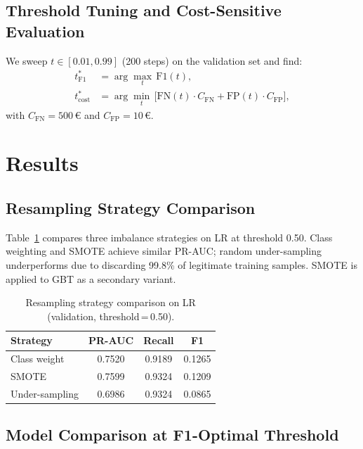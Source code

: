 \documentclass[conference]{IEEEtran}
\begin{document}
\subsection{Threshold Tuning and Cost-Sensitive Evaluation}

We sweep $t \in [0.01, 0.99]$ (200 steps) on the validation set and find:
\begin{align}
  t^*_{\text{F1}}   &= \arg\max_t\, \text{F1}(t), \\
  t^*_{\text{cost}} &= \arg\min_t\, \bigl[\text{FN}(t)\cdot C_{\text{FN}} + \text{FP}(t)\cdot C_{\text{FP}}\bigr],
  \label{eq:cost}
\end{align}
with $C_{\text{FN}} = 500$\,\euro{} and $C_{\text{FP}} = 10$\,\euro{}.

\section{Results}

\subsection{Resampling Strategy Comparison}

Table~\ref{tab:resampling} compares three imbalance strategies on LR at
threshold 0.50. Class weighting and SMOTE achieve similar PR-AUC; random
under-sampling underperforms due to discarding 99.8\% of legitimate training
samples. SMOTE is applied to GBT as a secondary variant.

\begin{table}[t]
  \centering
  \caption{Resampling strategy comparison on LR (validation, threshold\,=\,0.50).}
  \label{tab:resampling}
  \begin{tabular}{lccc}
    \toprule
    \textbf{Strategy} & \textbf{PR-AUC} & \textbf{Recall} & \textbf{F1} \\
    \midrule
    Class weight   & 0.7520 & 0.9189 & 0.1265 \\
    SMOTE          & 0.7599 & 0.9324 & 0.1209 \\
    Under-sampling & 0.6986 & 0.9324 & 0.0865 \\
    \bottomrule
  \end{tabular}
\end{table}

\subsection{Model Comparison at F1-Optimal Threshold}
\end{document}
